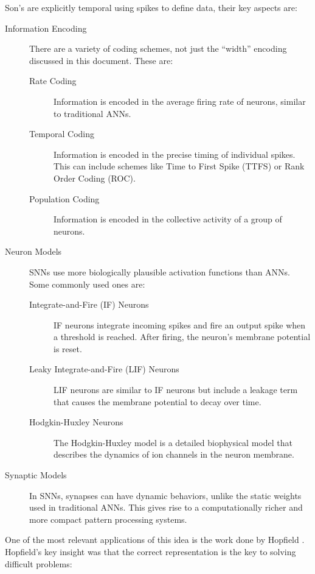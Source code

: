 \documentclass{article}
\begin{document}
Son's are explicitly temporal using spikes to define data, their key aspects are:

\begin{description}
	\item[Information Encoding] There are a variety of coding schemes, not just the ``width'' encoding discussed in this document. These are:
	      \begin{description}
		      \item[Rate Coding] Information is encoded in the average firing rate of neurons, similar to traditional ANNs.
		      \item[Temporal Coding] Information is encoded in the precise timing of individual spikes. This can include schemes like Time to First Spike (TTFS) or Rank Order Coding (ROC).
		      \item[Population Coding] Information is encoded in the collective activity of a group of neurons.
	      \end{description}
	      
	\item[Neuron Models] SNNs use more biologically plausible activation functions than ANNs. Some commonly used ones are:
	      \begin{description}
		      \item[Integrate-and-Fire (IF) Neurons] \cite{burkitt2006review} IF neurons integrate incoming spikes and fire an output spike when a threshold is reached. After firing, the neuron's membrane potential is reset.
		      \item[Leaky Integrate-and-Fire (LIF) Neurons] \cite{tal1997computing} LIF neurons are similar to IF neurons but include a leakage term that causes the membrane potential to decay over time.
		      \item[Hodgkin-Huxley Neurons] \cite{y2003computation} The Hodgkin-Huxley model is a detailed biophysical model that describes the dynamics of ion channels in the neuron membrane.
	      \end{description}
	\item[Synaptic Models] In SNNs, synapses can have dynamic behaviors, unlike the static weights used in traditional ANNs. This gives rise to a computationally richer and more compact pattern processing systems.
\end{description}

One of the most relevant applications of this idea is the work done by Hopfield \cite{hopfield1995pattern}. Hopfield's key insight was that the correct representation is the key to solving difficult problems:
\end{document}
